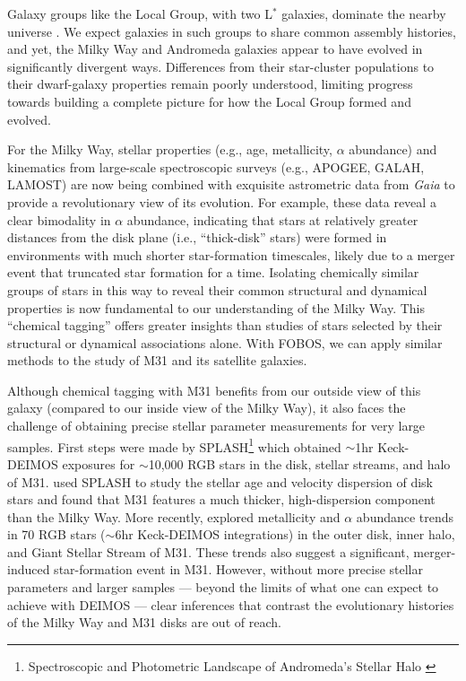 \documentclass[11pt,a4paper,twoside,onecolumn,openany,final,oldfontcommands]{memoir}
\begin{document}
Galaxy groups like the Local Group, with two L$^*$ galaxies, dominate the nearby universe \citep{kourkchi17}.  We expect galaxies in such groups to share common assembly histories, and yet, the Milky Way and Andromeda galaxies appear to have evolved in significantly divergent ways.  Differences from their star-cluster populations to their dwarf-galaxy properties remain poorly understood, limiting progress towards building a complete picture for how the Local Group formed and evolved.

For the Milky Way, stellar properties (e.g., age, metallicity, $\alpha$ abundance) and kinematics from large-scale spectroscopic surveys (e.g., APOGEE, GALAH, LAMOST) are now being combined with exquisite astrometric data from {\it Gaia} to provide a revolutionary view of its evolution.  For example, these data reveal a clear bimodality in $\alpha$ abundance, indicating that stars at relatively greater distances from the disk plane (i.e., ``thick-disk'' stars) were formed in environments with much shorter star-formation timescales, likely due to a merger event that truncated star formation for a time.  Isolating chemically similar groups of stars in this way to reveal their common structural and dynamical properties is now fundamental to our understanding of the Milky Way.  This ``chemical tagging'' offers greater insights than studies of stars selected by their structural or dynamical associations alone.  With FOBOS, we can apply similar methods to the study of M31 and its satellite galaxies.

Although chemical tagging with M31 benefits from our outside view of this galaxy (compared to our inside view of the Milky Way), it also faces the challenge of obtaining precise stellar parameter measurements for very large samples.  First steps were made by SPLASH\footnote{Spectroscopic and Photometric Landscape of Andromeda’s Stellar Halo \citep[e.g.][]{splash}} which obtained $\sim$1hr Keck-DEIMOS exposures for $\sim$10,000 RGB stars in the disk, stellar streams, and halo of M31.  \citet{dorman15} used SPLASH to study the stellar age and velocity dispersion of disk stars and found that M31 features a much thicker, high-dispersion component than the Milky Way.  More recently, \citet{Escala20} explored metallicity and $\alpha$ abundance trends in 70 RGB stars ($\sim$6hr Keck-DEIMOS integrations) in the outer disk, inner halo, and Giant Stellar Stream of M31.  These trends also suggest a significant, merger-induced star-formation event in M31.  However, without more precise stellar parameters and larger samples --- beyond the limits of what one can expect to achieve with DEIMOS --- clear inferences that contrast the evolutionary histories of the Milky Way and M31 disks are out of reach.
\end{document}
